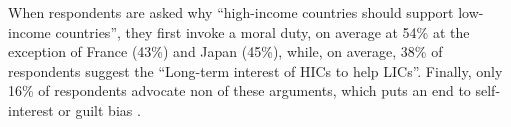 \documentclass[11pt,a4paper]{article}
\begin{document}


When respondents are asked why ``high-income countries should support low-income countries'', they first invoke a moral duty, on average at 54\% at the exception of France (43\%) and Japan (45\%), while, on average, 38\% of respondents suggest the ``Long-term interest of HICs to help LICs''. Finally, only 16\% of respondents advocate non of these arguments, which puts an end to self-interest or guilt bias \citep{fabre_public_2026}.


\newpage


\end{document}
